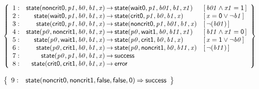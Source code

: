 \documentclass[a4paper]{article}
\def\lthtmlcheckvsize{\ifdim\ht\sizebox<\vsize 
  \ifdim\wd\sizebox<\hsize\expandafter\hfill\fi \expandafter\vfill
  \else\expandafter\vss\fi}%
\begin{document}
{\newpage\clearpage
{}%
$\displaystyle \left\{
\begin{array}{rr@{\>}c@{\>}ll}
\mathrm{1} : 
 & \mathsf{state}(\mathsf{noncrit0},\mathit{p1},\mathit{b0},\mathit{b1},\mathit{x})
 & \to 
 & \mathsf{state}(\mathsf{wait0},\mathit{p1},\mathit{b01},\mathit{b1},\mathit{x1})
 & [\, \mathit{b01} \land \mathit{x1} = \mathsf{1} \,]\\
\par
\mathrm{2} : 
 & \mathsf{state}(\mathsf{wait0},\mathit{p1},\mathit{b0},\mathit{b1},\mathit{x})
 & \to 
 & \mathsf{state}(\mathsf{crit0},\mathit{p1},\mathit{b0},\mathit{b1},\mathit{x})
 & [\, \mathit{x} = \mathsf{0} \lor \neg \mathit{b1} \,]\\
\par
\mathrm{3} : 
 & \mathsf{state}(\mathsf{crit0},\mathit{p1},\mathit{b0},\mathit{b1},\mathit{x})
 & \to 
 & \mathsf{state}(\mathsf{noncrit0},\mathit{p1},\mathit{b01},\mathit{b1},\mathit{x})
 & [\, \neg(\mathit{b01}) \,]\\
\par
\mathrm{4} : 
 & \mathsf{state}(\mathit{p0},\mathsf{noncrit1},\mathit{b0},\mathit{b1},\mathit{x})
 & \to 
 & \mathsf{state}(\mathit{p0},\mathsf{wait1},\mathit{b0},\mathit{b11},\mathit{x1})
 & [\, \mathit{b11} \land \mathit{x1} = \mathsf{0} \,]\\
\par
\mathrm{5} : 
 & \mathsf{state}(\mathit{p0},\mathsf{wait1},\mathit{b0},\mathit{b1},\mathit{x})
 & \to 
 & \mathsf{state}(\mathit{p0},\mathsf{crit1},\mathit{b0},\mathit{b1},\mathit{x})
 & [\, \mathit{x} = \mathsf{1} \lor \neg \mathit{b0} \,]\\
\par
\mathrm{6} : 
 & \mathsf{state}(\mathit{p0},\mathsf{crit1},\mathit{b0},\mathit{b1},\mathit{x})
 & \to 
 & \mathsf{state}(\mathit{p0},\mathsf{noncrit1},\mathit{b0},\mathit{b11},\mathit{x})
 & [\, \neg(\mathit{b11}) \,]\\
\par
\mathrm{7} : 
 & \mathsf{state}(\mathit{p0},\mathit{p1},\mathit{b0},\mathit{b1},\mathit{x})
 & \to 
 & \mathsf{success}\\
\par
\mathrm{8} : 
 & \mathsf{state}(\mathsf{crit0},\mathsf{crit1},\mathit{b0},\mathit{b1},\mathit{x})
 & \to 
 & \mathsf{error}\\
\par
\end{array}
\right\}
$%
\lthtmlindisplaymathZ
\lthtmlcheckvsize\clearpage}

{\newpage\clearpage
{}%
$\displaystyle \left\{
\begin{array}{rr@{\>}c@{\>}ll}
\mathrm{9} : 
 & \mathsf{state}(\mathsf{noncrit0},\mathsf{noncrit1},\mathsf{false},\mathsf{false},\mathsf{0})
 & \Rightarrow 
 & \mathsf{success}\\
\par
\end{array}
\right\}
$%
\lthtmlindisplaymathZ
\lthtmlcheckvsize\clearpage}
\end{document}
